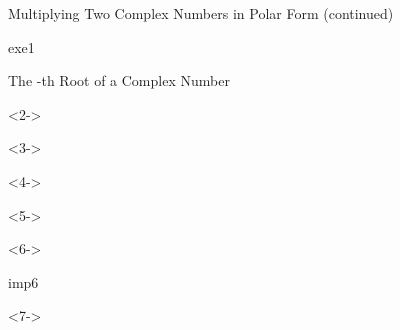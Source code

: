 \def\EMtitlesize{26}\def\EMtitleskip{31}
\begin{frame}{Multiplying Two Complex Numbers in Polar Form (continued)}
\begin{EMbox}{exe}{1}{}
\end{EMbox}
\end{frame}

\def\EMtitlesize{26}\def\EMtitleskip{31}
\begin{frame}{The -th Root of a Complex Number}
\begin{uncoverenv}<2->
\end{uncoverenv}
\EMgap
\begin{uncoverenv}<3->
\end{uncoverenv}
\EMgap
\begin{uncoverenv}<4->
\end{uncoverenv}
\EMgap
\begin{uncoverenv}<5->
\end{uncoverenv}
\EMgap
\begin{uncoverenv}<6->
\end{uncoverenv}
\EMgap
\begin{EMbox}{imp}{6}{}
\begin{uncoverenv}<7->
\end{uncoverenv}
\end{EMbox}
\end{frame}

